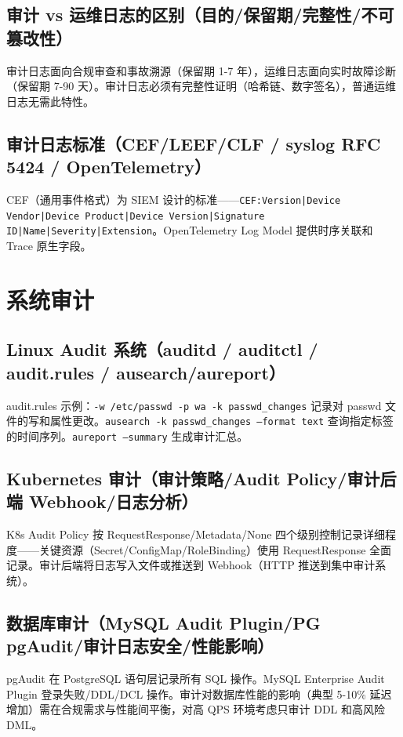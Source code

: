 \documentclass[12pt,UTF8]{ctexbook}
\begin{document}
    \subsection{审计 vs 运维日志的区别（目的/保留期/完整性/不可篡改性）}

审计日志面向合规审查和事故溯源（保留期 1-7 年），运维日志面向实时故障诊断（保留期 7-90 天）。审计日志必须有完整性证明（哈希链、数字签名），普通运维日志无需此特性。

    \subsection{审计日志标准（CEF/LEEF/CLF / syslog RFC 5424 / OpenTelemetry）}

CEF（通用事件格式）为 SIEM 设计的标准——\texttt{CEF:Version|Device Vendor|Device Product|Device Version|Signature ID|Name|Severity|Extension}。OpenTelemetry Log Model 提供时序关联和 Trace 原生字段。

  \section{系统审计}
    \subsection{Linux Audit 系统（auditd / auditctl / audit.rules / ausearch/aureport）}

audit.rules 示例：\texttt{-w /etc/passwd -p wa -k passwd\_changes} 记录对 passwd 文件的写和属性更改。\texttt{ausearch -k passwd\_changes --format text} 查询指定标签的时间序列。\texttt{aureport --summary} 生成审计汇总。

    \subsection{Kubernetes 审计（审计策略/Audit Policy/审计后端 Webhook/日志分析）}

K8s Audit Policy 按 RequestResponse/Metadata/None 四个级别控制记录详细程度——关键资源（Secret/ConfigMap/RoleBinding）使用 RequestResponse 全面记录。审计后端将日志写入文件或推送到 Webhook（HTTP 推送到集中审计系统）。

    \subsection{数据库审计（MySQL Audit Plugin/PG pgAudit/审计日志安全/性能影响）}

pgAudit 在 PostgreSQL 语句层记录所有 SQL 操作。MySQL Enterprise Audit Plugin 登录失败/DDL/DCL 操作。审计对数据库性能的影响（典型 5-10\% 延迟增加）需在合规需求与性能间平衡，对高 QPS 环境考虑只审计 DDL 和高风险 DML。
\end{document}

